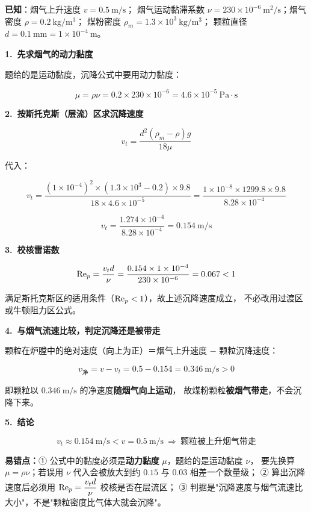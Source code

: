 \begin{jie}
\textbf{已知}：烟气上升速度 $v=0.5\ \mathrm{m/s}$；
烟气运动黏滞系数 $\nu=230\times10^{-6}\ \mathrm{m^2/s}$；烟气密度 $\rho=0.2\ \mathrm{kg/m^3}$；
煤粉密度 $\rho_m=1.3\times10^{3}\ \mathrm{kg/m^3}$；
颗粒直径 $d=0.1\ \mathrm{mm}=1\times10^{-4}\ \mathrm{m}$。

\textbf{1.\ 先求烟气的动力黏度}

题给的是运动黏度，沉降公式中要用动力黏度：

\[ \mu=\rho\nu=0.2\times230\times10^{-6}=4.6\times10^{-5}\ \mathrm{Pa\cdot s} \]

\textbf{2.\ 按斯托克斯（层流）区求沉降速度}

\[ v_t=\frac{d^2(\rho_m-\rho)g}{18\mu} \]

代入：

\[ v_t=\frac{(1\times10^{-4})^2\times(1.3\times10^{3}-0.2)\times9.8}
{18\times4.6\times10^{-5}}
=\frac{1\times10^{-8}\times1299.8\times9.8}{8.28\times10^{-4}} \]

\[ v_t=\frac{1.274\times10^{-4}}{8.28\times10^{-4}}=0.154\ \mathrm{m/s} \]

\textbf{3.\ 校核雷诺数}

\[ \mathrm{Re}_p=\frac{v_t d}{\nu}=\frac{0.154\times1\times10^{-4}}{230\times10^{-6}}
=0.067<1 \]

满足斯托克斯区的适用条件（$\mathrm{Re}_p<1$），故上述沉降速度成立，
不必改用过渡区或牛顿阻力区公式。

\textbf{4.\ 与烟气流速比较，判定沉降还是被带走}

颗粒在炉膛中的绝对速度（向上为正）＝烟气上升速度 $-$ 颗粒沉降速度：

\[ v_{\text{净}}=v-v_t=0.5-0.154=0.346\ \mathrm{m/s}>0 \]

即颗粒以 $0.346\ \mathrm{m/s}$ 的净速度\textbf{随烟气向上运动}，
故煤粉颗粒\textbf{被烟气带走}，不会沉降下来。

\textbf{5.\ 结论}

\[ v_t\approx0.154\ \mathrm{m/s}<v=0.5\ \mathrm{m/s}
\ \Longrightarrow\ \text{颗粒被上升烟气带走} \]

\begin{yicuo}
\textbf{易错点：}① 公式中的黏度必须是\textbf{动力黏度} $\mu$，题给的是运动黏度 $\nu$，
要先换算 $\mu=\rho\nu$；若误用 $\nu$ 代入会被放大到约 $0.15$ 与 $0.03$ 相差一个数量级；
② 算出沉降速度后必须用 $\mathrm{Re}_p=\dfrac{v_td}{\nu}$ 校核是否在层流区；
③ 判据是"沉降速度与烟气流速比大小"，不是"颗粒密度比气体大就会沉降"。
\end{yicuo}
\end{jie}

